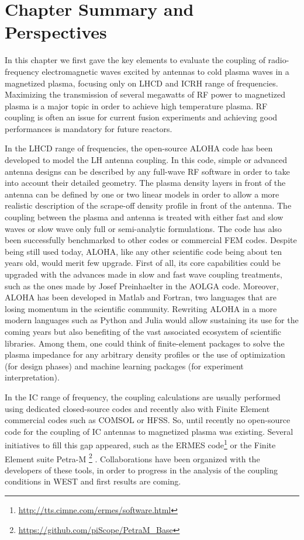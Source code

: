 \section{Chapter Summary and Perspectives}
In this chapter we first gave the key elements to evaluate the coupling of radio-frequency electromagnetic waves excited by antennas to cold plasma waves in a magnetized plasma, focusing only on LHCD and ICRH range of frequencies. Maximizing the transmission of several megawatts of RF power to magnetized plasma is a major topic in order to achieve high temperature plasma. RF coupling is often an issue for current fusion experiments and achieving good performances is mandatory for future reactors.


In the LHCD range of frequencies, the open-source ALOHA code has been developed to model the LH antenna coupling. In this code, simple or advanced antenna designs can be described by any full-wave RF software in order to take into account their detailed geometry. The plasma density layers in front of the antenna can be defined by one or two linear models in order to allow a more realistic description of the scrape-off density profile in front of the antenna. The coupling between the plasma and antenna is treated with either fast and slow waves or slow wave only full or semi-analytic formulations. The code has also been successfully benchmarked to other codes or commercial FEM codes. Despite being still used today, ALOHA, like any other scientific code being about ten years old, would merit few upgrade. First of all, its core capabilities could be upgraded with the advances made in slow and fast wave coupling treatments, such as the ones made by Josef Preinhaelter in the AOLGA code. Moreover, ALOHA has been developed in Matlab and Fortran, two languages that are losing momentum in the scientific community. Rewriting ALOHA in a more modern languages such as Python and Julia would allow sustaining its use for the coming years but also benefiting of the vast associated ecosystem of scientific libraries. Among them, one could think of finite-element packages to solve the plasma impedance for any arbitrary density profiles or the use of optimization (for design phases) and machine learning packages (for experiment interpretation).


In the IC range of frequency, the coupling calculations are usually performed using dedicated closed-source codes and recently also with Finite Element commercial codes such as COMSOL or HFSS. So, until recently no open-source code for the coupling of IC antennas to magnetized plasma was existing. Several initiatives to fill this gap appeared, such as the ERMES code\footnote{\url{http://tts.cimne.com/ermes/software.html}}  or the Finite Element suite Petra-M \footnote{\url{https://github.com/piScope/PetraM_Base}} . Collaborations have been organized with the developers of these tools, in order to progress in the analysis of the coupling conditions in WEST and first results are coming. 


